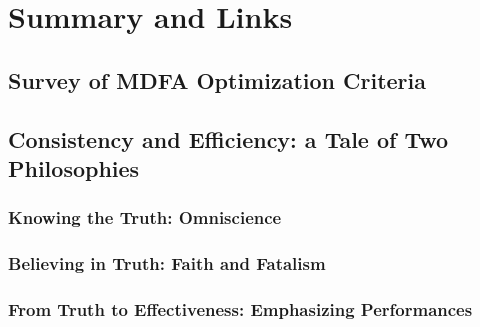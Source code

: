 \documentclass[a4paper]{book}
\begin{document}
% 







\chapter{Summary and Links}

\section{Survey of MDFA Optimization Criteria}

\section{Consistency and Efficiency: a Tale of Two Philosophies}

\subsection{Knowing the Truth: Omniscience}

\subsection{Believing in Truth: Faith and Fatalism}

\subsection{From Truth to Effectiveness: Emphasizing Performances}
\end{document}
